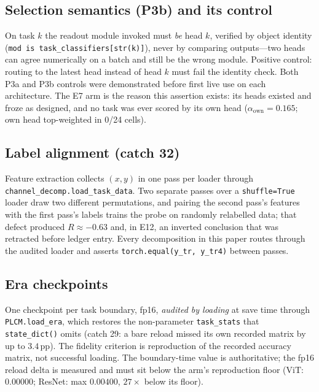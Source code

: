 \subsection{Selection semantics (P3b) and its control}

On task $k$ the readout module invoked must \emph{be} head $k$, verified by
object identity (\texttt{mod is task\_classifiers[str(k)]}), never by comparing
outputs---two heads can agree numerically on a batch and still be the wrong
module. Positive control: routing to the latest head instead of head $k$ must
fail the identity check. Both P3a and P3b controls were demonstrated before
first live use on each architecture. The E7 arm is the reason this assertion
exists: its heads existed and froze as designed, and no task was ever scored by
its own head ($\alpha_{\text{own}} = 0.165$; own head top-weighted in 0/24
cells).

\subsection{Label alignment (catch 32)}

Feature extraction collects $(x, y)$ in one pass per loader through
\texttt{channel\_decomp.load\_task\_data}. Two separate passes over a
\texttt{shuffle=True} loader draw two different permutations, and pairing the
second pass's features with the first pass's labels trains the probe on randomly
relabelled data; that defect produced $R \approx -0.63$ and, in E12, an inverted
conclusion that was retracted before ledger entry. Every decomposition in this
paper routes through the audited loader and asserts
\texttt{torch.equal(y\_tr, y\_tr4)} between passes.

\subsection{Era checkpoints}

One checkpoint per task boundary, fp16, \emph{audited by loading} at save time
through \texttt{PLCM.load\_era}, which restores the non-parameter
\texttt{task\_stats} that \texttt{state\_dict()} omits (catch 29: a bare reload
missed its own recorded matrix by up to $3.4$\,pp). The fidelity criterion is
reproduction of the recorded accuracy matrix, not successful loading. The
boundary-time value is authoritative; the fp16 reload delta is measured and must
sit below the arm's reproduction floor (ViT: $0.00000$; ResNet: max
$0.00400$, $27\times$ below its floor).


